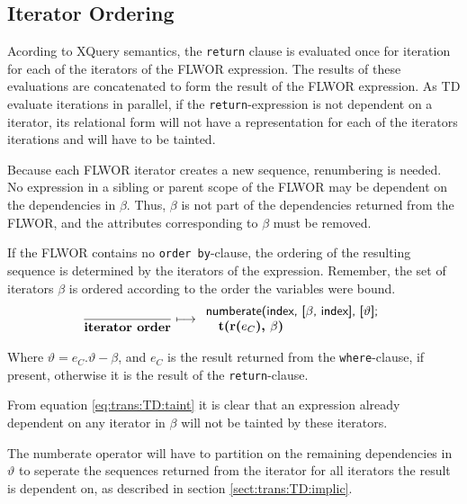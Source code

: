 \subsection{Iterator Ordering}
\label{sect:trans:TD:flwor:itOrd}
Acording to XQuery semantics, the \texttt{return} clause is evaluated once for iteration for each of the iterators
of the FLWOR expression. The results of these evaluations are concatenated to form the result of the FLWOR
expression. As TD evaluate iterations in parallel, if the \texttt{return}-expression is not dependent on a
iterator, its relational form will not have a representation for each of the iterators iterations and will have to be tainted.

Because each FLWOR iterator creates a new sequence, renumbering is needed. No expression in a sibling or parent
scope of the FLWOR may be dependent on the dependencies in $\beta$. Thus, $\beta$ is not part of the dependencies
returned from the FLWOR, and the attributes corresponding to $\beta$ must be removed. 

If the FLWOR contains no \texttt{order by}-clause, the ordering of the resulting sequence is determined by the
iterators of the expression. Remember, the set of iterators $\beta$ is ordered according to the order the
variables were bound.
\begin{equation}
\frac{}{\mbox{\textbf{iterator order}}}
\longmapsto
\begin{array}{l}
\mbox{\textsf{numberate(index, [}}\beta\mbox{\textsf{, index], [}}\vartheta\mbox{\textsf{];}} \\ \quad
\mbox{\textbf{t(r(}}e_{C}\mbox{\textbf{), }}\beta\mbox{\textbf{)}}
\end{array}
\label{rule:trans:TD:itOrd}
\end{equation}

Where $\vartheta = e_{C}.\vartheta - \beta$, and $e_C$ is the result returned from the \texttt{where}-clause, if
present, otherwise it is the result of the \texttt{return}-clause.

From equation \ref{eq:trans:TD:taint} it is clear that an expression already dependent on any iterator in $\beta$
will not be tainted by these iterators.

The \textsf{numberate} operator will have to partition on the remaining dependencies in $\vartheta$ to seperate
the sequences returned from the iterator for all iterators the result is dependent on, as described in section
\ref{sect:trans:TD:implic}.

